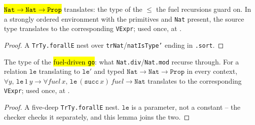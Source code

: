 \begin{lemma}
  \label{prim-cond:thm:trexprs-natnatprop}
  \leanok

   \hl{$\mathtt{Nat} \to \mathtt{Nat} \to \mathtt{Prop}$} translates: the type of the
  $\le$ the fuel recursions guard on.
  In a strongly ordered environment with the primitives and \texttt{Nat} present, the source type
  translates to the corresponding \texttt{VExpr}; used once, at
  .
\end{lemma}
\begin{proof}
  \leanok
   A \texttt{TrTy.forallE} nest over \texttt{trNat}/\texttt{natIsType'} ending in
  \texttt{.sort}.
\end{proof}

\begin{lemma}
  \label{prim-cond:thm:trexprs-divgotype}
  \leanok

   The type of the \hl{fuel-driven \texttt{go}}: what \texttt{Nat.div}/\texttt{Nat.mod}
  recurse through.
  For a relation $\mathtt{le}$ translating to $\mathtt{le}'$ and typed $\mathtt{Nat} \to
  \mathtt{Nat} \to \mathtt{Prop}$ in every context, $\forall y,\,\mathtt{le}\,1\,y \to \forall
  \mathit{fuel}\,x,\,\mathtt{le}\,(\mathtt{succ}\,x)\,\mathit{fuel} \to \mathtt{Nat}$ translates to
  the corresponding \texttt{VExpr}; used once, at
  .
\end{lemma}
\begin{proof}
  \leanok
   A five-deep \texttt{TrTy.forallE} nest. $\mathtt{le}$ is a parameter, not a constant
  -- the checker checks it separately, and this lemma joins the two.
\end{proof}

